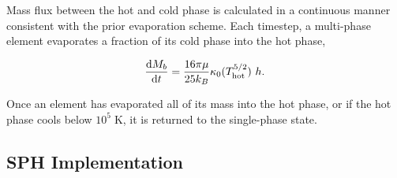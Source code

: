 Mass flux between the hot and cold phase is calculated in a continuous manner
consistent with the prior evaporation scheme.  Each timestep, a multi-phase
element evaporates a fraction of its cold phase into the hot phase,

\begin{equation}\label{multiphase_evaporation}
    \frac{{\rm d}M_b}{{\rm d}t} = \frac{16\pi\mu}{25k_B} \kappa_0 (T_{\rm hot}^{5/2})\ h.
\end{equation}

Once an element has evaporated all of its mass into the hot phase, or if the hot
phase cools below $10^5\;\mathrm{K}$, it is returned to the single-phase state.

\subsection{SPH Implementation}

